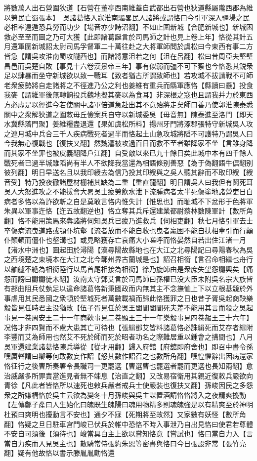 將數萬人出石營圍狄道【石營在董亭西南維蓋自武都出石營也狄道縣屬隴西郡為維以勞民亡蜀張本】　吳諸葛恪入寇淮南驅畧民人諸將或謂恪曰今引軍深入疆場之民必相率遠遁恐兵勞而功少【場音亦少詩沼翻】不如止圍新城【合肥新城也】新城困救必至至而圖之乃可大獲【此即諸葛誕言於司馬師之計也見上卷上年】恪從其計五月還軍圍新城詔太尉司馬孚督軍二十萬往赴之大將軍師問於虞松曰今東西有事二方皆急【謂吳攻淮南蜀攻隴西也】而諸將意沮若之何【沮在呂翻】松曰昔周亞夫堅壁昌邑而吳楚自敗【事見十六卷漢景帝三年】事有似弱而彊不可下察也今恪悉其鋭衆足以肆暴而坐守新城欲以致一戰耳【致者猶古所謂致師也】若攻城不拔請戰不可師老衆疲勢將自走諸將之不徑進乃公之利也姜維有重兵而縣軍應恪【縣讀曰懸】投食我麥【謂維軍後無轉餉投兵魏地擬其麥以為食耳】非深根之寇也且謂我并力於東西方必虛是以徑進今若使關中諸軍倍道急赴出其不意殆將走矣師曰善乃使郭淮陳泰悉關中之衆解狄道之圍敕毋丘儉案兵自守以新城委吳【毋音無】陳泰進至洛門【即天水冀縣落門聚】姜維糧盡退還【果如虞松所料】揚州牙門將涿郡張特守新城吳人攻之連月城中兵合三千人疾病戰死者過半而恪起土山急攻城將䧟不可護特乃謂吳人曰今我無心復戰也【復扶又翻】然魏灋被攻過百日而救不至者雖降家不坐【言雖身降而其家不坐罪也被皮義翻降戶江翻】自受敵以來已九十餘日矣此城中本有四千餘人戰死者已過半城雖䧟尚有半人不欲降我當還為相語條别善惡【為于偽翻語牛倨翻别彼列翻】明日早送名且以我印綬去為信乃投其印綬與之吳人聽其辭而不取印綬【綬音受】特乃投夜徹諸屋材栅補其缺為二重【重直龍翻】明日謂吳人曰我但有鬬死耳吳人大怒進攻之不能拔會大暑吳士疲勞飲水泄下流腫病者太半死傷塗地諸營吏日白病者多恪以為詐欲斬之自是莫敢言恪内惟失計【惟思也】而耻城不下忿形于色將軍朱異以軍事迕恪【迕五故翻逆也】恪立奪其兵斥還建業都尉蔡林數陳軍計【數所角翻】恪不能用策馬來犇諸將伺知吳兵已疲乃進救兵【伺相吏翻】秋七月恪引軍去士卒傷病流曳道路或頓仆坑壑【流者放而不能自收也曳者羸困不能自扶相牽引而行顛仆顛頓而僵仆也壑溝也】或見略獲存亡哀痛大小嗟呼而恪晏然自若出住江渚一月【渚水中洲也】圖起田於潯陽【漢尋陽故縣地也在大江之北尋陽記曰尋陽春秋為吳之西境楚之東境本在大江之北今鄿州界古蘭城是也】詔召相銜【言召命相繼也舟行以舳艫不絶為相銜陸行以馬首尾相接為相銜】徐乃旋師由是衆庶失望怨讟興矣【痛怨而謗曰讟讟徒木翻】汝南太守鄧艾言於司馬師曰孫權已没大臣未附吳名宗大族皆有部曲阻兵仗埶足以違命諸葛恪新秉國政而内無其主不念撫恤上下以立根基競於外事虐用其民悉國之衆頓於堅城死者萬數載禍而歸此恪獲罪之日也昔子胥吳起商鞅樂毅皆見任時君主没猶敗【伍子胥見任於吳王闔閭闔閭死夫差不能用其言而殺之吳起事見一卷周安王二十一年商鞅事見二卷顯王三十一年樂毅事見四卷赧王三十六年】况恪才非四賢而不慮大患其亡可待也【張緝鄧艾皆料諸葛恪必誅緝死而艾存者緝附李豐而艾為師用也然艾不死於師而死於昭者功名之際難居重以鍾會之搆間也】八月吳軍還建業諸葛恪陳兵導從【從才用翻】歸入府舘【府舘即府舍也】即召中書令孫嘿厲聲謂曰卿等何敢數妄作詔【怒其數作詔召之也數所角翻】嘿惶懼辭出因病還家恪征行之後曹所奏署令長職司一更罷選【曹選曹也罷選者罷而更選也長知兩翻】愈治威嚴多所罪責當進見者無不竦息【治直之翻】又改易宿衛用其親近復敕兵嚴欲向青徐【凡此者皆恪所以速死也敕兵嚴者戒兵士使嚴装也復扶又翻】孫峻因民之多怨衆之所嫌構恪於吳主云欲為變冬十月孫峻與吳主謀置酒請恪恪將入之夜精爽擾動【左傳鄭子產曰人生始化曰魄既生魄陽曰魂用物精多則魂魄強是以有精爽至於神明杜預曰爽明也擾動言不安也】通夕不寐【死期將至故然】又家數有妖怪【數所角翻】恪疑之旦日駐車宫門峻已伏兵於帷中恐恪不時入事泄乃自出見恪曰使君若尊體不安自可須後【須待也】峻當具白主上欲以嘗知恪意【嘗試也】恪曰當自力入【言當自力疾而入見吳主也】散騎常侍張約朱恩等密書與恪曰今日張設非常【張竹亮翻】疑有他故恪以書示滕胤胤勸恪還